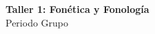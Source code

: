 \documentclass[11pt,letterpaper]{article}
\begin{document}
\begin{center}
{\large\bfseries \institucion}\\[4pt]
{\large \nombreCurso}\\[8pt]
{\LARGE\bfseries Taller 1: Fonética y Fonología}\\[4pt]
Periodo \periodoAcademico\quad Grupo \grupoCurso
\end{center}

\end{document}
